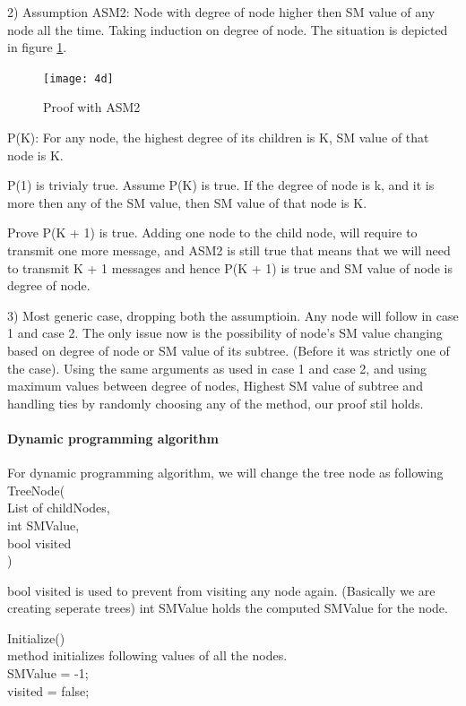 2) Assumption ASM2: Node with degree of node higher then SM value of any node all the time. 
Taking induction on degree of node. The situation is depicted in figure \ref{fig:4d}. 

\begin{figure}[4d]
    \centering
    \texttt{[image: 4d]}
    \caption{Proof with ASM2}
    \label{fig:4d}
\end{figure}
 
P(K): For any node, the highest degree of  its children is K, SM value of that node is K. 

P(1) is trivialy true. 
Assume P(K) is true. If the degree of node is k, and it is more then any of the SM value, then SM value of that node is K.  

Prove P(K + 1) is true. 
Adding one node to the child node, will require to transmit one more message, and ASM2 is still true that means that we will need to transmit K + 1 messages and hence P(K + 1) is true and SM value of node is degree of node.  

3) Most generic case, dropping both the assumptioin. 
Any node will follow in case 1 and case 2. The only issue now is the possibility of node's SM value changing based on degree of node or SM value of its subtree. (Before it was strictly one of the case). Using the same arguments as used in case 1 and case 2, and using maximum values between {degree of nodes, Highest SM  value of subtree} and handling ties by randomly choosing any of the method, our proof stil holds. 

\paragraph{Dynamic programming algorithm}
For dynamic programming algorithm, we will change the tree node as following \\
TreeNode(\\
List of childNodes,  \\
int SMValue, \\
bool visited \\
)

bool visited is used to prevent from visiting any node again. (Basically we are creating seperate trees)
int SMValue holds the computed SMValue for the node. 

Initialize() \\
method initializes following values of all the nodes. \\
SMValue = -1; \\
visited = false;\\


